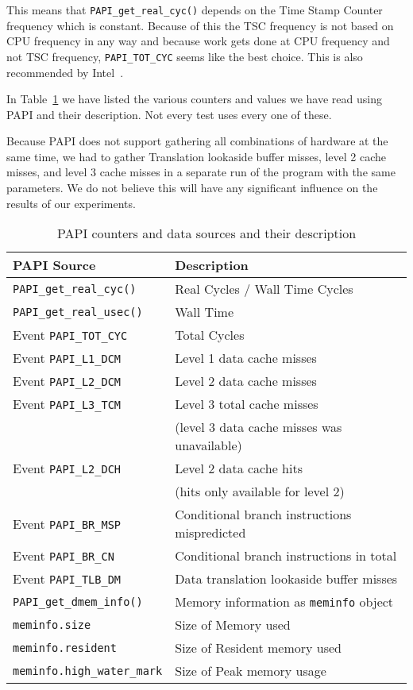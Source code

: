 This means that \texttt{PAPI\_get\_real\_cyc()} depends on the Time Stamp Counter frequency which is constant. 
Because of this the TSC frequency is not based on CPU frequency in any way and because work gets done at CPU frequency and not TSC frequency, \texttt{PAPI\_TOT\_CYC} seems like the best choice. 
This is also recommended by Intel~\citep{IntelMeasuringTheAverageUnhaltedFrequency}.

In Table~\ref{papievents} we have listed the various counters and values we have read using PAPI and their description. Not every test uses every one of these.

Because PAPI does not support gathering all combinations of hardware at the same time, we had to gather Translation lookaside buffer misses, level 2 cache misses, and level 3 cache misses in a separate run of the program with the same parameters.
We do not believe this will have any significant influence on the results of our experiments.

\begin{table}
\caption{PAPI counters and data sources and their description}
\label{papievents}
\center
\begin{tabular}{|l|l|}
\hline
\textbf{PAPI Source}	& \textbf{Description} \\ \hline
\texttt{PAPI\_get\_real\_cyc()}	& Real Cycles / Wall Time Cycles \\ \hline
\texttt{PAPI\_get\_real\_usec()}	& Wall Time \\ \hline
Event \texttt{PAPI\_TOT\_CYC}	& Total Cycles \\ \hline
Event \texttt{PAPI\_L1\_DCM}		& Level 1 data cache misses \\ \hline
Event \texttt{PAPI\_L2\_DCM}		& Level 2 data cache misses \\ \hline
Event \texttt{PAPI\_L3\_TCM}		& Level 3 total cache misses\\
& (level 3 data cache misses was unavailable) \\ \hline
Event \texttt{PAPI\_L2\_DCH}		& Level 2 data cache hits \\
& (hits only available for level 2) \\ \hline
Event \texttt{PAPI\_BR\_MSP}		& Conditional branch instructions mispredicted \\ \hline
Event \texttt{PAPI\_BR\_CN}		& Conditional branch instructions in total \\ \hline
Event \texttt{PAPI\_TLB\_DM}		& Data translation lookaside buffer misses \\ \hline
\texttt{PAPI\_get\_dmem\_info()}	& Memory information as \texttt{meminfo} object \\ \hline
\texttt{meminfo.size}			& Size of Memory used \\ \hline
\texttt{meminfo.resident}		& Size of Resident memory used \\ \hline
\texttt{meminfo.high\_water\_mark}	& Size of Peak memory usage \\ \hline

\end{tabular}
\end{table}
